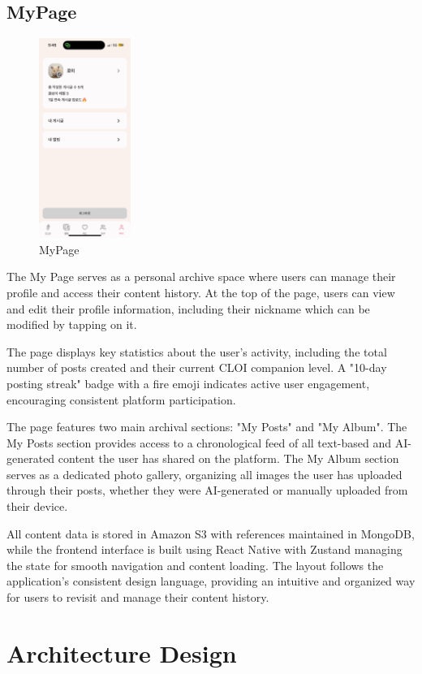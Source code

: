   \subsection{MyPage}
        \begin{figure}[htbp]
            \centerline{\includegraphics[width=3cm]{Images/page/mypage.png}}
            \caption{MyPage}
            \label{fig}
        \end{figure}
        The My Page serves as a personal archive space where users can manage their profile and access their content history. At the top of the page, users can view and edit their profile information, including their nickname which can be modified by tapping on it.

        The page displays key statistics about the user's activity, including the total number of posts created and their current CLOI companion level. A "10-day posting streak" badge with a fire emoji indicates active user engagement, encouraging consistent platform participation.

        The page features two main archival sections: "My Posts" and "My Album". The My Posts section provides access to a chronological feed of all text-based and AI-generated content the user has shared on the platform. The My Album section serves as a dedicated photo gallery, organizing all images the user has uploaded through their posts, whether they were AI-generated or manually uploaded from their device.

        All content data is stored in Amazon S3 with references maintained in MongoDB, while the frontend interface is built using React Native with Zustand managing the state for smooth navigation and content loading. The layout follows the application's consistent design language, providing an intuitive and organized way for users to revisit and manage their content history.

\section{Architecture Design}
